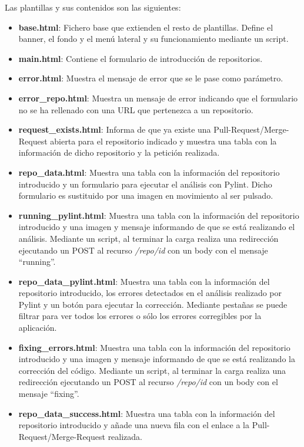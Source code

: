 \documentclass[a4paper, 12pt]{book}
\begin{document}
Las plantillas y sus contenidos son las siguientes:
\begin{itemize}
	\item \textbf{base.html}: Fichero base que extienden el resto de plantillas. Define el banner, el fondo y el menú lateral y su funcionamiento mediante un script.
	\item \textbf{main.html}: Contiene el formulario de introducción de repositorios.
	\item \textbf{error.html}: Muestra el mensaje de error que se le pase como parámetro.
	\item \textbf{error\_repo.html}: Muestra un mensaje de error indicando que el formulario no se ha rellenado con una URL que pertenezca a un repositorio.
	\item \textbf{request\_exists.html}: Informa de que ya existe una Pull-Request/Merge-Request abierta para el repositorio indicado y muestra una tabla con la información de dicho repositorio y la petición realizada.
	\item \textbf{repo\_data.html}: Muestra una tabla con la información del repositorio introducido y un formulario para ejecutar el análisis con Pylint. Dicho formulario es sustituido por una imagen en movimiento al ser pulsado.
	\item \textbf{running\_pylint.html}: Muestra una tabla con la información del repositorio introducido y una imagen y mensaje informando de que se está realizando el análisis. Mediante un script, al terminar la carga realiza una redirección ejecutando un POST al recurso \textit{/repo/id} con un body con el mensaje ``running''.
	\item \textbf{repo\_data\_pylint.html}: Muestra una tabla con la información del repositorio introducido, los errores detectados en el análisis realizado por Pylint y un botón para ejecutar la corrección. Mediante pestañas se puede filtrar para ver todos los errores o sólo los errores corregibles por la aplicación.
	\item \textbf{fixing\_errors.html}: Muestra una tabla con la información del repositorio introducido y una imagen y mensaje informando de que se está realizando la corrección del código. Mediante un script, al terminar la carga realiza una redirección ejecutando un POST al recurso \textit{/repo/id} con un body con el mensaje ``fixing''.
	\item \textbf{repo\_data\_success.html}:  Muestra una tabla con la información del repositorio introducido y añade una nueva fila con el enlace a la Pull-Request/Merge-Request realizada.

\end{itemize}
\end{document}
